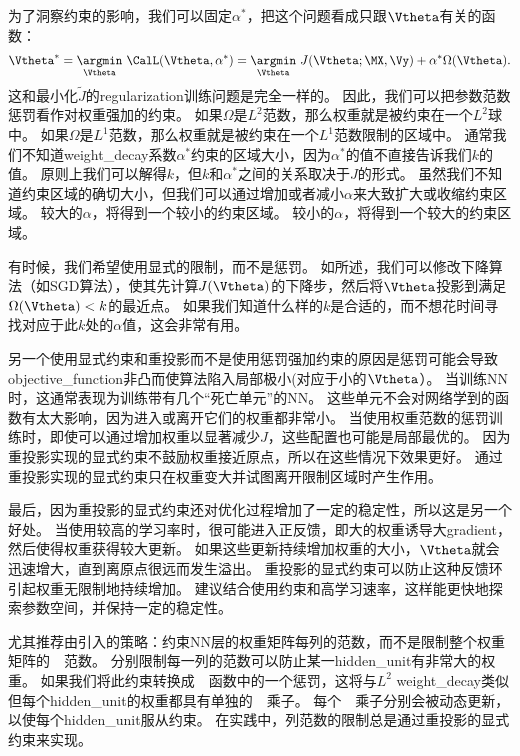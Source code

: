 为了洞察约束的影响，我们可以固定$\alpha^*$，把这个问题看成只跟$\Vtheta$有关的函数：
\begin{align}
 \Vtheta^* =  \underset{\Vtheta}{ \argmin} ~\CalL(\Vtheta, \alpha^*) = 
 \underset{\Vtheta}{ \argmin}~
 J(\Vtheta; \MX, \Vy) + \alpha^* \Omega(\Vtheta).
\end{align}
这和最小化$\tilde J$的\gls{regularization}训练问题是完全一样的。
因此，我们可以把参数范数惩罚看作对权重强加的约束。
如果$\Omega$是$L^2$范数，那么权重就是被约束在一个$L^2$球中。
如果$\Omega$是$L^1$范数，那么权重就是被约束在一个$L^1$范数限制的区域中。
通常我们不知道\gls{weight_decay}系数$\alpha^*$约束的区域大小，因为$\alpha^*$的值不直接告诉我们$k$的值。
原则上我们可以解得$k$，但$k$和$\alpha^*$之间的关系取决于$J$的形式。
虽然我们不知道约束区域的确切大小，但我们可以通过增加或者减小$\alpha$来大致扩大或收缩约束区域。
较大的$\alpha$，将得到一个较小的约束区域。
较小的$\alpha$，将得到一个较大的约束区域。


有时候，我们希望使用显式的限制，而不是惩罚。
如所述，我们可以修改下降算法（如\gls{SGD}算法），使其先计算$J(\Vtheta)$的下降步，然后将$\Vtheta$投影到满足$\Omega(\Vtheta) < k$的最近点。
如果我们知道什么样的$k$是合适的，而不想花时间寻找对应于此$k$处的$\alpha$值，这会非常有用。

另一个使用显式约束和重投影而不是使用惩罚强加约束的原因是惩罚可能会导致\gls{objective_function}非凸而使算法陷入局部极小(对应于小的$\Vtheta$）。
当训练\gls{NN}时，这通常表现为训练带有几个``死亡单元''的\gls{NN}。
这些单元不会对网络学到的函数有太大影响，因为进入或离开它们的权重都非常小。
当使用权重范数的惩罚训练时，即使可以通过增加权重以显著减少$J$，这些配置也可能是局部最优的。
因为重投影实现的显式约束不鼓励权重接近原点，所以在这些情况下效果更好。
通过重投影实现的显式约束只在权重变大并试图离开限制区域时产生作用。

最后，因为重投影的显式约束还对优化过程增加了一定的稳定性，所以这是另一个好处。
当使用较高的学习率时，很可能进入正反馈，即大的权重诱导大\gls{gradient}，然后使得权重获得较大更新。
如果这些更新持续增加权重的大小，$\Vtheta$就会迅速增大，直到离原点很远而发生溢出。
重投影的显式约束可以防止这种反馈环引起权重无限制地持续增加。
\cite{Hinton-et-al-arxiv2012}建议结合使用约束和高学习速率，这样能更快地探索参数空间，并保持一定的稳定性。


\cite{Hinton-et-al-arxiv2012}尤其推荐由\cite{Srebro05}引入的策略：约束\gls{NN}层的权重矩阵每列的范数，而不是限制整个权重矩阵的~~范数。
分别限制每一列的范数可以防止某一\gls{hidden_unit}有非常大的权重。
如果我们将此约束转换成~~函数中的一个惩罚，这将与$L^2$ \gls{weight_decay}类似但每个\gls{hidden_unit}的权重都具有单独的~~乘子。
每个~~乘子分别会被动态更新，以使每个\gls{hidden_unit}服从约束。
在实践中，列范数的限制总是通过重投影的显式约束来实现。

